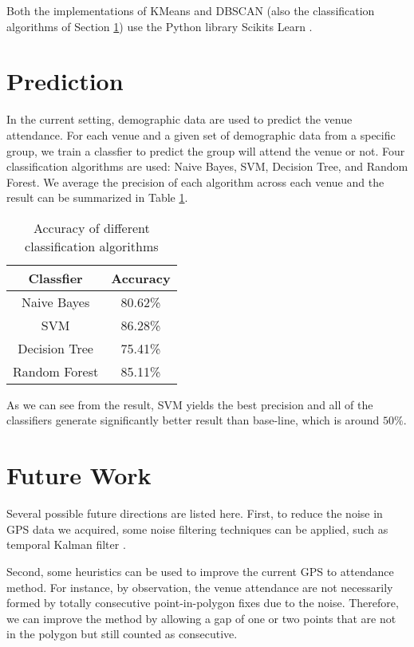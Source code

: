 \documentclass[12pt]{article}
\begin{document}
Both the implementations of KMeans and DBSCAN (also the classification algorithms of Section \ref{prediction}) use the Python library Scikits Learn \cite{sklearn}.

\section{Prediction}\label{prediction}

In the current setting, demographic data are used to predict the venue attendance. For each venue and a given set of demographic data from a specific group, we train a classfier to predict the group will attend the venue or not. Four classification algorithms are used: Naive Bayes, SVM, Decision Tree, and Random Forest. We average the precision of each algorithm across each venue and the result can be summarized in Table \ref{class-accu}.

\begin{table}
\begin{center}
    \begin{tabular}{ | c | c | }
        \hline
        \textbf {Classfier} & \textbf{Accuracy} \\ \hline
        \hline
        Naive Bayes     & 80.62\% \\ \hline
        SVM             & 86.28\% \\ \hline
        Decision Tree   & 75.41\% \\ \hline
        Random Forest   & 85.11\% \\ \hline
    \end{tabular}
\caption{Accuracy of different classification algorithms}
\label{class-accu}
\end{center}
\end{table}

As we can see from the result, SVM yields the best precision and all of the classifiers generate significantly better result than base-line, which is around $50\%$. 

\section{Future Work}\label{future_work}

Several possible future directions are listed here. First, to reduce the noise in GPS data we acquired, some noise filtering techniques can be applied, such as temporal Kalman filter \cite{Welch95}.

Second, some heuristics can be used to improve the current GPS to attendance method. For instance, by observation, the venue attendance are not necessarily formed by totally consecutive point-in-polygon fixes due to the noise. Therefore, we can improve the method by allowing a gap of one or two points that are not in the polygon but still counted as consecutive.
\end{document}
